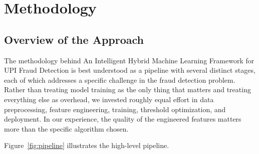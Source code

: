 \chapter{Methodology}

\section{Overview of the Approach}

The methodology behind An Intelligent Hybrid Machine Learning Framework for UPI Fraud Detection is best understood as a pipeline with several distinct stages, each of which addresses a specific challenge in the fraud detection problem. Rather than treating model training as the only thing that matters and treating everything else as overhead, we invested roughly equal effort in data preprocessing, feature engineering, training, threshold optimization, and deployment. In our experience, the quality of the engineered features matters more than the specific algorithm chosen.

Figure~\ref{fig:pipeline} illustrates the high-level pipeline.


